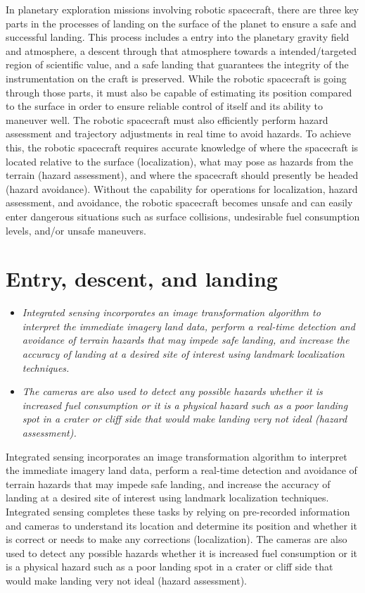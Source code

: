 In planetary exploration missions involving robotic spacecraft, there
are three key parts in the processes of landing on the surface of the
planet to ensure a safe and successful landing. This process includes a
entry into the planetary gravity field and atmosphere, a descent through
that atmosphere towards a intended/targeted region of scientific value,
and a safe landing that guarantees the integrity of the instrumentation
on the craft is preserved. While the robotic spacecraft is going through
those parts, it must also be capable of estimating its position compared
to the surface in order to ensure reliable control of itself and its
ability to maneuver well. The robotic spacecraft must also efficiently
perform hazard assessment and trajectory adjustments in real time to
avoid hazards. To achieve this, the robotic spacecraft requires accurate
knowledge of where the spacecraft is located relative to the surface
(localization), what may pose as hazards from the terrain (hazard
assessment), and where the spacecraft should presently be headed (hazard
avoidance). Without the capability for operations for localization,
hazard assessment, and avoidance, the robotic spacecraft becomes unsafe
and can easily enter dangerous situations such as surface collisions,
undesirable fuel consumption levels, and/or unsafe maneuvers.

\section{Entry, descent, and landing}\label{entry-descent-and-landing}

\begin{itemize}
\item
  \emph{Integrated sensing incorporates an image transformation
  algorithm to interpret the immediate imagery land data, perform a
  real-time detection and avoidance of terrain hazards that may impede
  safe landing, and increase the accuracy of landing at a desired site
  of interest using landmark localization techniques.}
\item
  \emph{The cameras are also used to detect any possible hazards whether
  it is increased fuel consumption or it is a physical hazard such as a
  poor landing spot in a crater or cliff side that would make landing
  very not ideal (hazard assessment).}
\end{itemize}

Integrated sensing incorporates an image transformation algorithm to
interpret the immediate imagery land data, perform a real-time detection
and avoidance of terrain hazards that may impede safe landing, and
increase the accuracy of landing at a desired site of interest using
landmark localization techniques. Integrated sensing completes these
tasks by relying on pre-recorded information and cameras to understand
its location and determine its position and whether it is correct or
needs to make any corrections (localization). The cameras are also used
to detect any possible hazards whether it is increased fuel consumption
or it is a physical hazard such as a poor landing spot in a crater or
cliff side that would make landing very not ideal (hazard assessment).

